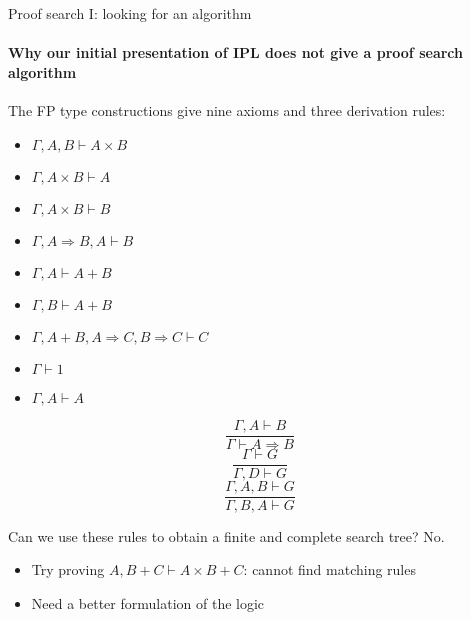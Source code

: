 \documentclass[english]{beamer}
\begin{document}
\begin{frame}{Proof search I: looking for an algorithm}


\framesubtitle{Why our initial presentation of IPL does not give a proof search
algorithm}

The FP type constructions give nine axioms and three derivation rules:

\begin{minipage}[t]{0.49\columnwidth}%
\begin{itemize}
\item $\Gamma,A,B\vdash A\times B$ 
\item $\Gamma,A\times B\vdash A$ 
\item $\Gamma,A\times B\vdash B$
\item $\Gamma,A\Rightarrow B,A\vdash B$
\item $\Gamma,A\vdash A+B$ 
\item $\Gamma,B\vdash A+B$
\item $\Gamma,A+B,A\Rightarrow C,B\Rightarrow C\vdash C$
\item $\Gamma\vdash1$
\item $\Gamma,A\vdash A$
\end{itemize}
%
\end{minipage}%
\begin{minipage}[t]{0.49\columnwidth}%
\[
\frac{\Gamma,A\vdash B}{\Gamma\vdash A\Rightarrow B}
\]
\[
\frac{\Gamma\vdash G}{\Gamma,D\vdash G}
\]
\[
\frac{\Gamma,A,B\vdash G}{\Gamma,B,A\vdash G}
\]
%
\end{minipage}

\medskip{}
Can we use these rules to obtain a finite and complete search tree?
No.
\begin{itemize}
\item Try proving $A,B+C\vdash A\times B+C$: cannot find matching rules
\item Need a better formulation of the logic
\end{itemize}
\end{frame}
\end{document}
